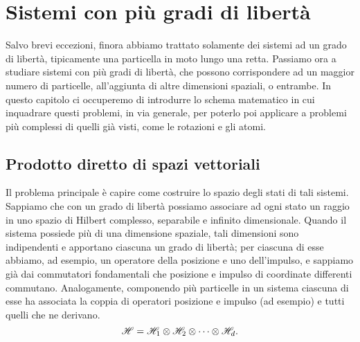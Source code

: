 \chapter{Sistemi con più gradi di libertà} \label{ch:multi}
Salvo brevi eccezioni, finora abbiamo trattato solamente dei sistemi ad un grado di libertà, tipicamente una particella in moto lungo una retta.
Passiamo ora a studiare sistemi con più gradi di libertà, che possono corrispondere ad un maggior numero di particelle, all'aggiunta di altre dimensioni spaziali, o entrambe.
In questo capitolo ci occuperemo di introdurre lo schema matematico in cui inquadrare questi problemi, in via generale, per poterlo poi applicare a problemi più complessi di quelli già visti, come le rotazioni e gli atomi.

\section{Prodotto diretto di spazi vettoriali}
Il problema principale è capire come costruire lo spazio degli stati di tali sistemi.
Sappiamo che con un grado di libertà possiamo associare ad ogni stato un raggio in uno spazio di Hilbert complesso, separabile e infinito dimensionale.
Quando il sistema possiede più di una dimensione spaziale, tali dimensioni sono indipendenti e apportano ciascuna un grado di libertà; per ciascuna di esse abbiamo, ad esempio, un operatore della posizione e uno dell'impulso, e sappiamo già dai commutatori fondamentali che posizione e impulso di coordinate differenti commutano.
Analogamente, componendo più particelle in un sistema ciascuna di esse ha associata la coppia di operatori posizione e impulso (ad esempio) e tutti quelli che ne derivano.
\begin{equation}
	\mathscr H=\mathscr H_1\otimes\mathscr H_2\otimes\cdots\otimes\mathscr H_d.
\end{equation}

